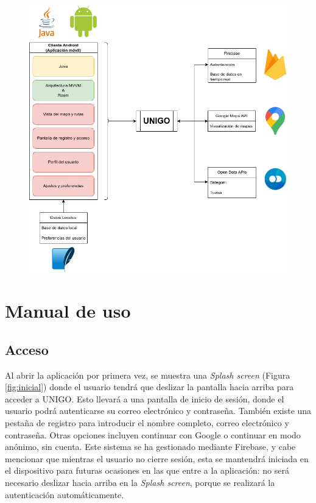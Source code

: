 \documentclass[a4paper,12pt]{report}
\begin{document}
\begin{figure}[H]
    \centering
    \includegraphics[scale=0.6]{img/arquitectura.png}
    \label{fig:arquitectura.png}
\end{figure}
  
\chapter{Manual de uso}
\section{Acceso}
  Al abrir la aplicación por primera vez, se muestra una \textit{Splash screen} (Figura \ref{fig:inicial}) donde el usuario tendrá que deslizar la pantalla hacia arriba para acceder a UNIGO. Esto llevará a una pantalla de inicio de sesión, donde el usuario podrá autenticarse su correo electrónico y contraseña. También existe una pestaña de registro para introducir el nombre completo, correo electrónico y contraseña. Otras opciones incluyen continuar con Google o continuar en modo anónimo, sin cuenta. Este sistema se ha gestionado mediante Firebase, y cabe mencionar que mientras el usuario no cierre sesión, esta se mantendrá iniciada en el dispositivo para futuras ocasiones en las que entre a la aplicación: no será necesario deslizar hacia arriba en la \textit{Splash screen}, porque se realizará la autenticación automáticamente.
\end{document}
